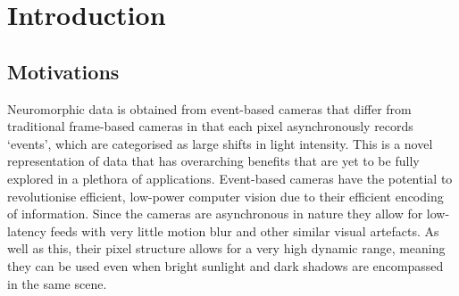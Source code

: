 \chapter{Introduction} \setcounter{page}{1} \label{chap:introduction}

\section{Motivations}

Neuromorphic data is obtained from event-based cameras that differ from traditional frame-based cameras in that each pixel asynchronously records `events', which are categorised as large shifts in light intensity. This is a novel representation of data that has overarching benefits that are yet to be fully explored in a plethora of applications. Event-based cameras have the potential to revolutionise efficient, low-power computer vision due to their efficient encoding of information. Since the cameras are asynchronous in nature they allow for low-latency feeds with very little motion blur and other similar visual artefacts. As well as this, their pixel structure allows for a very high dynamic range, meaning they can be used even when bright sunlight and dark shadows are encompassed in the same scene.

